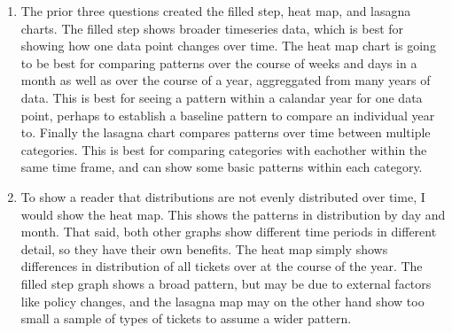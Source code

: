 \documentclass[
  letterpaper,
  DIV=11,
  numbers=noendperiod]{scrartcl}
\providecommand{\tightlist}{%
  \setlength{\itemsep}{0pt}\setlength{\parskip}{0pt}}\usepackage{longtable,booktabs,array}
\begin{document}
\begin{enumerate}
\def\labelenumi{\arabic{enumi}.}
\tightlist
\item
  The prior three questions created the filled step, heat map, and
  lasagna charts. The filled step shows broader timeseries data, which
  is best for showing how one data point changes over time. The heat map
  chart is going to be best for comparing patterns over the course of
  weeks and days in a month as well as over the course of a year,
  aggreggated from many years of data. This is best for seeing a pattern
  within a calandar year for one data point, perhaps to establish a
  baseline pattern to compare an individual year to. Finally the lasagna
  chart compares patterns over time between multiple categories. This is
  best for comparing categories with eachother within the same time
  frame, and can show some basic patterns within each category.
\item
  To show a reader that distributions are not evenly distributed over
  time, I would show the heat map. This shows the patterns in
  distribution by day and month. That said, both other graphs show
  different time periods in different detail, so they have their own
  benefits. The heat map simply shows differences in distribution of all
  tickets over at the course of the year. The filled step graph shows a
  broad pattern, but may be due to external factors like policy changes,
  and the lasagna map may on the other hand show too small a sample of
  types of tickets to assume a wider pattern.
\end{enumerate}
\end{document}
